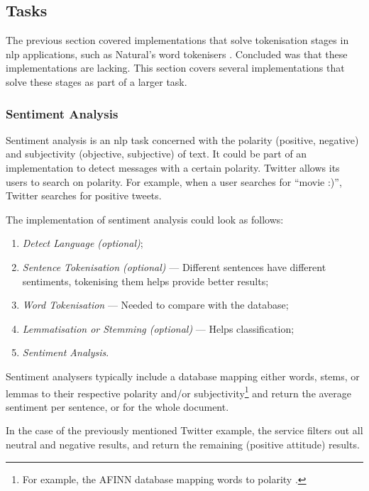 \subsection{Tasks}\label{tasks}

The previous section covered implementations that solve tokenisation stages
  in \gls{nlp} applications, such as Natural's word
  tokenisers \autocite{NaturalNode/natural-source-code}.
Concluded was that these implementations are lacking.
This section covers several implementations that solve these stages
  as part of a larger task.

\subsubsection{Sentiment Analysis}\label{sentiment-analysis}

Sentiment analysis is an \gls{nlp} task concerned with the polarity
  (positive, negative) and subjectivity (objective, subjective) of text.
It could be part of an implementation to detect messages with a certain
  polarity.
Twitter allows its users to search on polarity.
For example, when a user searches for ``movie :)'', Twitter searches for
  positive tweets.

The implementation of sentiment analysis could look as follows:

\begin{enumerate}
\item\emph{Detect Language (optional)};
\item\emph{Sentence Tokenisation (optional)} --- Different sentences have
    different sentiments, tokenising them helps provide better results;
\item\emph{Word Tokenisation} --- Needed to compare with the database;
\item\emph{Lemmatisation or Stemming (optional)} --- Helps classification;
\item\emph{Sentiment Analysis}.
\end{enumerate}

\noindent Sentiment analysers typically include a
  database mapping either words, stems, or lemmas to their respective
  polarity and\slash or subjectivity\footnote{For example, the AFINN
    database mapping words to polarity \autocite{nielsen-finn-arup-afinn}.}
  and return the average sentiment per sentence, or for the whole document.

In the case of the previously mentioned Twitter example, the service filters
  out all neutral and negative results, and return the remaining (positive
  attitude) results.

